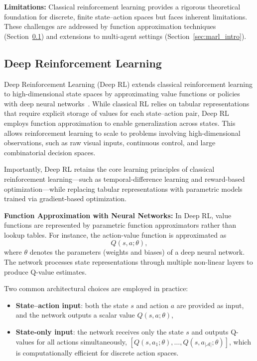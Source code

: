 \textbf{Limitations:}  
Classical reinforcement learning provides a rigorous theoretical foundation for discrete, finite state–action spaces but faces inherent limitations. These challenges are addressed by function approximation techniques (Section~\ref{sec:deep_rl}) and extensions to multi-agent settings (Section~\ref{sec:marl_intro}).



\subsection{Deep Reinforcement Learning}
\label{sec:deep_rl}

Deep Reinforcement Learning (Deep RL) extends classical reinforcement learning to high-dimensional state spaces by approximating value functions or policies with deep neural networks~\cite{mnih2015human}. While classical RL relies on tabular representations that require explicit storage of values for each state–action pair, Deep RL employs function approximation to enable generalization across states. This allows reinforcement learning to scale to problems involving high-dimensional observations, such as raw visual inputs, continuous control, and large combinatorial decision spaces.

Importantly, Deep RL retains the core learning principles of classical reinforcement learning—such as temporal-difference learning and reward-based optimization—while replacing tabular representations with parametric models trained via gradient-based optimization.

\textbf{Function Approximation with Neural Networks:}  
In Deep RL, value functions are represented by parametric function approximators rather than lookup tables. For instance, the action-value function is approximated as
\begin{equation}
Q(s,a;\theta),
\label{eq:deep_q_function}
\end{equation}
where $\theta$ denotes the parameters (weights and biases) of a deep neural network. The network processes state representations through multiple non-linear layers to produce Q-value estimates.

Two common architectural choices are employed in practice:
\begin{itemize}
    \item \textbf{State–action input}: both the state $s$ and action $a$ are provided as input, and the network outputs a scalar value $Q(s,a;\theta)$,
    \item \textbf{State-only input}: the network receives only the state $s$ and outputs Q-values for all actions simultaneously, $[Q(s,a_1;\theta), \ldots, Q(s,a_{|\mathcal{A}|};\theta)]$, which is computationally efficient for discrete action spaces.
\end{itemize}

